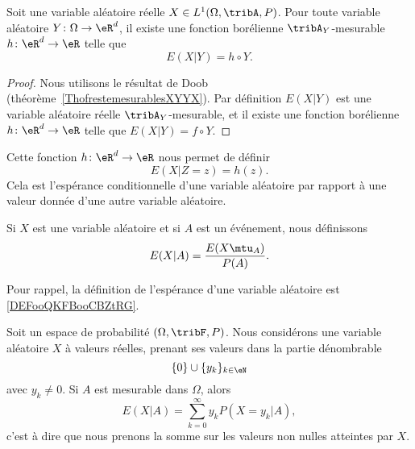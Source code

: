\begin{proposition}
    Soit une variable aléatoire réelle \( X\in L^1(\Omega,\tribA,P)\). Pour toute variable aléatoire \( Y\colon \Omega\to \eR^d\), il existe une fonction borélienne \( \tribA_Y\)-mesurable \( h\colon \eR^d\to \eR\) telle que
    \begin{equation}
        E(X|Y)=h\circ Y.
    \end{equation}
\end{proposition}

\begin{proof}
    Nous utilisons le résultat de Doob (théorème~\ref{ThofrestemesurablesXYYX}). Par définition \( E(X|Y)\) est une variable aléatoire réelle \( \tribA_Y\)-mesurable, et il existe une fonction borélienne \( h\colon \eR^d\to \eR\) telle que \( E(X|Y)=f\circ Y\).
\end{proof}

Cette fonction \( h\colon \eR^d\to \eR\) nous permet de définir
\begin{equation}
    E(X|Z=z)=h(z).
\end{equation}
Cela est l'espérance conditionnelle d'une variable aléatoire par rapport à une valeur donnée d'une autre variable aléatoire.

\begin{definition}     \label{DEFooOMLCooJgrbpx}
    Si \( X\) est une variable aléatoire et si \( A\) est un événement, nous définissons
    \begin{equation}
        E(X|A)=\frac{ E(X\mtu_A) }{ P(A) }.
    \end{equation}
\end{definition}
Pour rappel, la définition de l'espérance d'une variable aléatoire est \ref{DEFooQKFBooCBZtRG}.

\begin{lemma}    \label{LEMooRTVBooCEeIxL}
    Soit un espace de probabilité \( (\Omega,\tribF,P)\). Nous considérons une variable aléatoire \( X\) à valeurs réelles, prenant ses valeurs dans la partie dénombrable 
    \begin{equation}
        \{ 0 \}\cup \{ y_k \}_{k\in \eN}
    \end{equation}
    avec \( y_k\neq 0\).  Si \( A\) est mesurable dans \( \Omega\), alors
    \begin{equation}
        E(X|A)=\sum_{k=0}^{\infty}y_kP(X=y_k|A),
    \end{equation}
    c'est à dire que nous prenons la somme sur les valeurs non nulles atteintes par \( X\).
\end{lemma}

